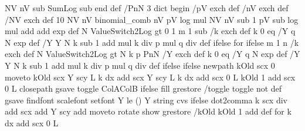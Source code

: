 {{{                                                  NV nV sub SumLog sub
                                                end
                                              } def
                /PnN {
                              3 dict begin
                              /pV exch def
                              /nV exch def
                              /NV exch def
                              10
                              NV nV binomial_comb
                              nV pV log mul
                              NV nV sub 1 pV sub log mul add add
                              exp
                             } def
          N ValueSwitch2Log gt { } {%
                                     0 1 m 1 sub {%
                                                              /k exch def       %
                                                              k 0 eq
                                                              { /Y q N exp def }
                                                              { /Y Y N k sub 1 add mul k div p mul q div def }
                                                              ifelse
                                                           } for
                                     } ifelse
                                m 1 n {%
                                             /k exch def       %
                                             N ValueSwitch2Log gt { N k p PnN /Y exch def }
                                                               { k 0 eq
                                                                             { /Y q N exp def }
                                                                             { /Y Y N k sub 1 add mul k div p mul q div def }
                                                                             ifelse
                                                             } ifelse %
      \ifx\psk@fillstylename\pst@alternateColors
        newpath
        kOld scx 0 moveto
      \fi
      kOld scx Y scy L k dx add scx Y scy L
      \ifPst@markZeros k dx add scx 0 L kOld 1 add scx 0 L \fi
      \ifx\psk@fillstylename\pst@alternateColors
        closepath
        gsave toggle {ColA}{ColB} ifelse \tx@setTransparency fill grestore
        /toggle toggle not def
      \fi
      \ifPst@printValue
        gsave \psk@PSfont\space findfont \psk@fontscale scalefont setfont \pst@usecolor\psk@LabelColor %
        Y \psFunc@PrintVLimit le { () } { Y \psk@valuewidth\space string cvs } ifelse
        \ifPst@comma dot2comma \fi
        k scx  div add \psFunc@xlabelsep scx add
        Y scy \pst@number\pslabelsep add moveto
        \psFunc@langle rotate show grestore
      \fi
      /kOld kOld 1 add def
    } for
    \ifPst@markZeros\else k dx add scx 0 L \fi %
  }%
  \end@OpenObj
}%
